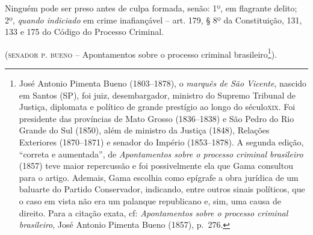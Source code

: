 \asterisc{}

Ninguém pode ser preso antes de culpa formada, senão: 1º, em flagrante
delito; 2º, \emph{quando indiciado} em crime inafiançável -- art. 179, §
8º da Constituição, 131, 133 e 175 do Código do
Processo Criminal.

(\textsc{senador p. bueno} -- Apontamentos sobre o processo criminal
brasileiro\footnote{ José Antonio Pimenta Bueno (1803--1878), o
  \emph{marquês de São Vicente}, nascido em Santos (SP), foi juiz,
  desembargador, ministro do Supremo Tribunal de Justiça, diplomata e
  político de grande prestígio ao longo do século\textsc{xix}. Foi presidente
  das províncias de Mato Grosso (1836--1838) e São Pedro do Rio Grande do
  Sul (1850), além de ministro da Justiça (1848), Relações Exteriores
  (1870--1871) e senador do Império (1853--1878). A segunda edição,
  ``correta e aumentada'', de \emph{Apontamentos sobre o processo criminal
  brasileiro} (1857) teve maior repercussão e foi possivelmente ela que
  Gama consultou para o artigo. Ademais, Gama escolhia como epígrafe a
  obra jurídica de um baluarte do Partido Conservador, indicando, entre
  outros sinais políticos, que o caso em vista não era um palanque
  republicano e, sim, uma causa de direito. Para a citação exata, cf:
  \emph{Apontamentos sobre o processo criminal brasileiro}, José Antonio
  Pimenta Bueno (1857), p.~276.}).

